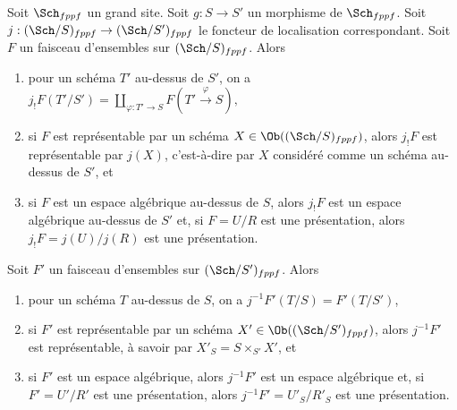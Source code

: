 \begin{lemma}
\label{lemma-change-base-scheme}
Soit $\Sch_{fppf}$ un grand site.
Soit $g : S \to S'$ un morphisme de $\Sch_{fppf}$.
Soit $j : (\Sch/S)_{fppf} \to (\Sch/S')_{fppf}$ le
foncteur de localisation correspondant.
Soit $F$ un faisceau d'ensembles sur $(\Sch/S)_{fppf}$.
Alors
\begin{enumerate}
\item pour un schéma $T'$ au-dessus de $S'$, on a
$j_!F(T'/S') =
\coprod\nolimits_{\varphi : T' \to S} F(T' \xrightarrow{\varphi} S),$
\item si $F$ est représentable par un schéma
$X \in \Ob((\Sch/S)_{fppf})$,
alors $j_!F$ est représentable par $j(X)$, c'est-à-dire par
$X$ considéré comme un schéma au-dessus de $S'$, et
\item si $F$ est un espace algébrique au-dessus de $S$, alors $j_!F$ est un
espace algébrique au-dessus de $S'$ et, si $F = U/R$ est une présentation,
alors $j_!F = j(U)/j(R)$ est une présentation.
\end{enumerate}
Soit $F'$ un faisceau d'ensembles sur $(\Sch/S')_{fppf}$. Alors
\begin{enumerate}
\item[(4)] pour un schéma $T$ au-dessus de $S$, on a $j^{-1}F'(T/S) = F'(T/S')$,
\item[(5)] si $F'$ est représentable par un schéma
$X' \in \Ob((\Sch/S')_{fppf})$, alors
$j^{-1}F'$ est représentable, à savoir par $X'_S = S \times_{S'} X'$, et
\item[(6)] si $F'$ est un espace algébrique, alors
$j^{-1}F'$ est un espace algébrique et, si $F' = U'/R'$ est une présentation,
alors $j^{-1}F' = U'_S/R'_S$ est une présentation.
\end{enumerate}
\end{lemma}


